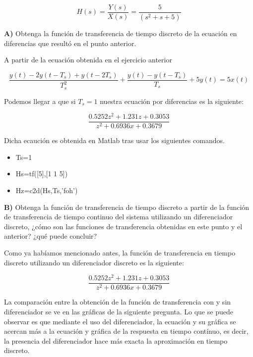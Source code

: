 \begin{equation}
	H(s)=\frac{Y(s)}{X(s)}=\frac{5}{(s^2+s+5)}
\end{equation}


\textbf{A)} Obtenga la función de transferencia de tiempo discreto de la ecuación en diferencias que resultó en	el punto anterior.

A partir de la ecuación obtenida en el ejercicio anterior

\begin{equation}
\frac{y(t)-2y(t-T_s)+y(t-2T_s)}{T_s^2}+\frac{y(t)-y(t-T_s)}{T_s}+5y(t)=5x(t)
\end{equation}

Podemos llegar a que si $T_s=1$ nuestra ecuación por diferencias es la siguiente:



\begin{equation}
\frac{0.5252z^2+1.231z+0.3053}{z^2 +0.6936x + 0.3679}
\end{equation}

Dicha ecaución es obtenida en Matlab tras usar los siguientes comandos.

\begin{itemize}
\item Ts=1
\item Hs=tf([5],[1 1 5])
\item Hz=c2d(Hs,Ts,'foh')
\end{itemize}

\textbf{B)}  Obtenga la función de transferencia de tiempo discreto a partir de la función de transferencia de tiempo continuo del sistema utilizando un diferenciador discreto, ¿cómo son las funciones de transferencia obtenidas en este punto y el anterior? ¿qué puede concluir?

Como ya habíamos mencionado antes, la función de transferencia en tiempo discreto utilizando un diferenciador discreto es la siguiente:

\begin{equation}
\frac{0.5252z^2+1.231z+0.3053}{z^2 +0.6936x + 0.3679}
\end{equation}

La comparación entre la obtención de la función de transferencia con y sin diferenciador se ve en las gráficas de la siguiente pregunta. Lo que se puede observar es que mediante el uso del diferenciador, la ecuación y su gráfica se acercan más a la ecuación y gráfica de la respuesta en tiempo contínuo, es decir, la presencia del diferenciador hace más exacta la aproximación en tiempo discreto.

